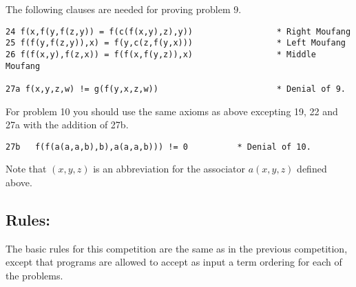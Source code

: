 The following clauses are needed for proving problem 9.

\begin{verbatim}
24 f(x,f(y,f(z,y)) = f(c(f(x,y),z),y))                 * Right Moufang
25 f(f(y,f(z,y)),x) = f(y,c(z,f(y,x)))                 * Left Moufang
26 f(f(x,y),f(z,x)) = f(f(x,f(y,z)),x)                 * Middle Moufang

27a f(x,y,z,w) != g(f(y,x,z,w))                        * Denial of 9.
\end{verbatim} 

For problem 10 you should use the same axioms as above excepting 19,
22 and 27a with the addition of 27b.

\begin{verbatim}
27b	  f(f(a(a,a,b),b),a(a,a,b))) != 0 	       * Denial of 10.
\end{verbatim}

Note that $(x,y,z)$ is an abbreviation for the associator $a(x,y,z)$
defined above.

\subsection*{Rules:}

The basic rules for this competition are the same as in the previous
competition, except that programs are allowed to accept as input a term
ordering for each of the problems.  


